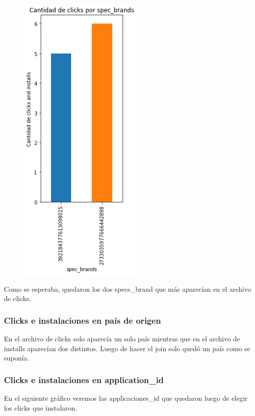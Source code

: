 \documentclass[a4paper, 12pt]{article}
\begin{document}
{{	
		\begin{figure}[H]
			\centering
			\includegraphics[scale = 0.5]{images/clicks-installs/specs_brand.png}
			\caption{}
		\end{figure}
	

	Como se esperaba, quedaron los dos specs\_brand que más aparecian en el archivo de clicks.
	
	\subsubsection{Clicks e instalaciones en país de origen}
	En el archivo de clicks solo aparecía un solo país mientras que en el archivo de installs aparecían dos distintos. Luego de hacer el join solo quedó un país como se suponía.
	
	\subsubsection{Clicks e instalaciones en application\_id}
	En el siguiente gráfico veremos las applicaciones\_id que quedaron luego de elegir los clicks que instalaron.
	
}}
\end{document}
